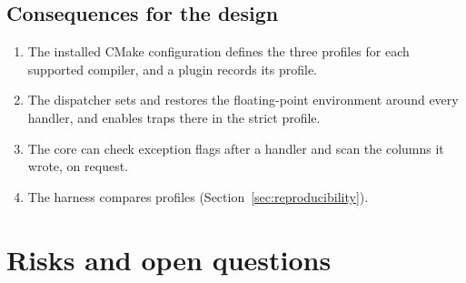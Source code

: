 \documentclass[11pt,a4paper]{article}
\begin{document}
\subsection{Consequences for the design}

\begin{enumerate}
  \item The installed CMake configuration defines the three profiles for
        each supported compiler, and a plugin records its profile.
  \item The dispatcher sets and restores the floating-point environment
        around every handler, and enables traps there in the strict
        profile.
  \item The core can check exception flags after a handler and scan the
        columns it wrote, on request.
  \item The harness compares profiles
        (Section~\ref{sec:reproducibility}).
\end{enumerate}

\section{Risks and open questions}
\label{sec:risks}
\end{document}
